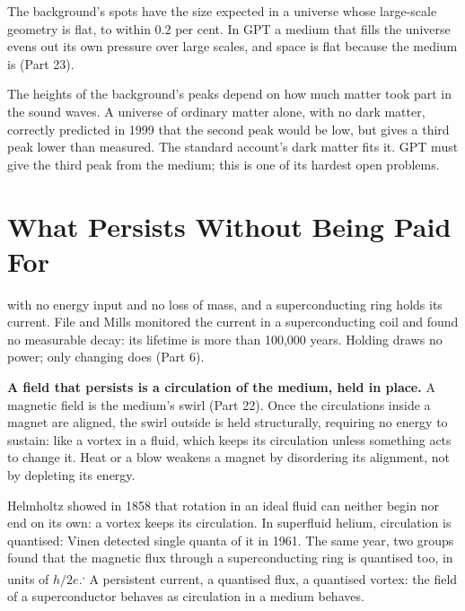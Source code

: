 \documentclass[11pt,a4paper]{article}
\begin{document}
 The background's spots have the size expected in a universe whose large-scale geometry is flat, to within 0.2 per cent. In GPT  a medium that fills the universe evens out its own pressure over large scales, and space is flat because the medium is (Part 23).

 The heights of the background's peaks depend on how much matter took part in the sound waves. A universe of ordinary matter alone, with no dark matter, correctly predicted in 1999 that the second peak would be low, but gives a third peak lower than measured. The standard account's dark matter fits it. GPT must give the third peak from the medium; this is one of its hardest open problems.

\section{What Persists Without Being Paid For}

 with no energy input and no loss of mass, and a superconducting ring holds its current. File and Mills monitored the current in a superconducting coil and found no measurable decay: its lifetime is more than 100,000 years. Holding draws no power; only changing does (Part 6).

\begin{hypbar}
\textbf{A field that persists is a circulation of the medium, held in place.} A magnetic field is the medium's swirl (Part 22).\footnotemark{} Once the circulations inside a magnet are aligned, the swirl outside is held structurally, requiring no energy to sustain: like a vortex in a fluid, which keeps its circulation unless something acts to change it. Heat or a blow weakens a magnet by disordering its alignment, not by depleting its energy.
\end{hypbar}

 Helmholtz showed in 1858 that rotation in an ideal fluid can neither begin nor end on its own: a vortex keeps its circulation. In superfluid helium, circulation is quantised: Vinen detected single quanta of it in 1961. The same year, two groups found that the magnetic flux through a superconducting ring is quantised too, in units of $h/2e$.\textsuperscript{,} A persistent current, a quantised flux, a quantised vortex: the field of a superconductor behaves as circulation in a medium behaves.
\end{document}
